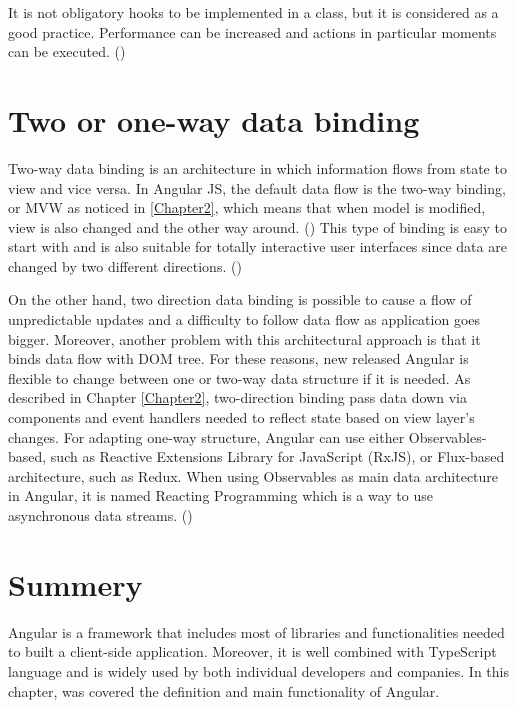 It is not obligatory hooks to be implemented in a class, but it is considered as a good practice. Performance can be increased and actions in particular moments can be executed. (\cite{murray2018ng}) \par

\section{Two or one-way data binding}

Two-way data binding is an architecture in which information flows from state to view and vice versa. In Angular JS, the default data flow is the two-way binding, or MVW as noticed in \ref{Chapter2}, which means that when model is modified, view is also changed and the other way around. (\cite{murray2018ng}) This type of binding is easy to start with and is also suitable for totally interactive user interfaces since data are changed by two different directions. (\cite{Reference21}) \par

On the other hand, two direction data binding is possible to cause a flow of unpredictable updates and a difficulty to follow data flow as application goes bigger. Moreover, another problem with this architectural approach is that it binds data flow with DOM tree. For these reasons, new released Angular is flexible to change between one or two-way data structure if it is needed. As described in Chapter \ref{Chapter2}, two-direction binding pass data down via components and event handlers needed to reflect state based on view layer's changes. For adapting one-way structure, Angular can use either Observables-based, such as Reactive Extensions Library for JavaScript (RxJS), or Flux-based architecture, such as Redux. When using Observables as main data architecture in Angular, it is named Reacting Programming which is a way to use asynchronous data streams. (\cite{murray2018ng}) \par

\section{Summery}

Angular is a framework that includes most of libraries and functionalities needed to built a client-side application. Moreover, it is well combined with TypeScript language and is widely used by both individual developers and companies. In this chapter, was covered the definition and main functionality of Angular. \par

